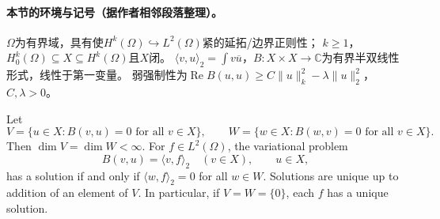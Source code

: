 
\paragraph{本节的环境与记号（据作者相邻段落整理）。}
$\Omega$为有界域，具有使$H^k(\Omega)\hookrightarrow L^2(\Omega)$紧的延拓/边界正则性；
$k\geq1$，$H^k_0(\Omega)\subseteq X\subseteq H^k(\Omega)$且$X$闭。
$\langle v,u\rangle_2=\int v\overline u$，$B:X\times X\to\mathbb C$为有界半双线性形式，线性于第一变量。
弱强制性为$\operatorname{Re}B(u,u)\geq C\|u\|_k^2-\lambda\|u\|_2^2$，$C,\lambda>0$。
\begin{theorem}
Let
\[
V=\{u\in X:B(v,u)=0\text{ for all }v\in X\},\qquad
W=\{w\in X:B(w,v)=0\text{ for all }v\in X\}.
\]
Then $\dim V=\dim W<\infty$. For $f\in L^2(\Omega)$, the variational
problem
\[
B(v,u)=\langle v,f\rangle_2\quad(v\in X),\qquad u\in X,
\]
has a solution if and only if $\langle w,f\rangle_2=0$ for all $w\in W$.
Solutions are unique up to addition of an element of $V$.
In particular, if $V=W=\{0\}$, each $f$ has a unique solution.
\end{theorem}
